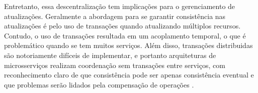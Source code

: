 Entretanto, essa descentralização tem implicações para o gerenciamento de atualizações. Geralmente a abordagem para se garantir consistência nas atualizações é pelo uso de transações quando atualizando múltiplos recursos. Contudo, o uso de transações resultada em um acoplamento temporal, o que é problemático quando se tem muitos serviços. Além disso, transações distribuidas são notoriamente difíceis de implementar, e portanto arquiteturas de microsserviços realizam coordenação sem transações entre serviços, com reconhecimento claro de que consistência pode ser apenas consistência eventual e que problemas serão lidados pela compensação de operações \cite{martin-fowler-microservices}.




    


